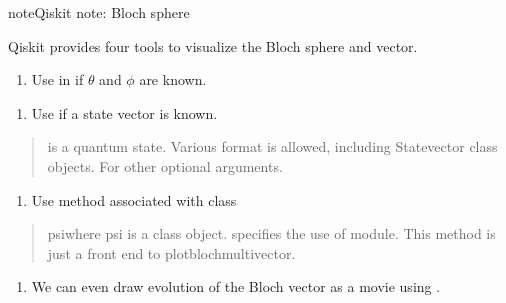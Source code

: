 \documentclass[letterpaper,10pt,english]{jupyterBook}
\begin{document}
\begin{sphinxadmonition}{note}{Qiskit note: Bloch sphere}

\sphinxAtStartPar
Qiskit provides four tools to visualize the Bloch sphere and vector.
\begin{enumerate}
%
\item {}
\sphinxAtStartPar
Use  in  if \(\theta\) and \(\phi\) are known.

\end{enumerate}
\begin{quote}

\sphinxAtStartPar
{}
\end{quote}
\begin{enumerate}
%
\item {}
\sphinxAtStartPar
Use  if a state vector is known.

\end{enumerate}
\begin{quote}

\sphinxAtStartPar
{} is a quantum state. Various format is allowed, including Statevector class objects.
For other optional arguments.
\end{quote}
\begin{enumerate}
%
\item {}
\sphinxAtStartPar
Use  method associated with  class

\end{enumerate}
\begin{quote}

\sphinxAtStartPar
psiwhere psi is a  class object.   specifies the use of  module.  This method is just a front end to plot\sphinxhyphen{}bloch\sphinxhyphen{}multivector.
\end{quote}
\begin{enumerate}
%
\item {}
\sphinxAtStartPar
We can even draw evolution of the Bloch vector as a movie using .


\end{enumerate}
\end{sphinxadmonition}
\end{document}
